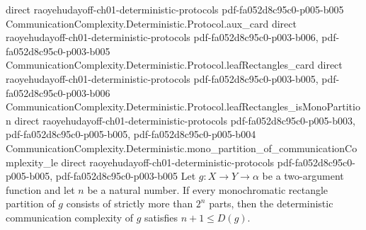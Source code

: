 \begin{theorem}
  {direct}
  {raoyehudayoff-ch01-deterministic-protocols}
  {pdf-fa052d8c95c0-p005-b005}
\proofstep
  {CommunicationComplexity.Deterministic.Protocol.aux_card}
  {direct}
  {raoyehudayoff-ch01-deterministic-protocols}
  {pdf-fa052d8c95c0-p003-b006,
    pdf-fa052d8c95c0-p003-b005}
\proofstep
  {CommunicationComplexity.Deterministic.Protocol.leafRectangles_card}
  {direct}
  {raoyehudayoff-ch01-deterministic-protocols}
  {pdf-fa052d8c95c0-p003-b005,
    pdf-fa052d8c95c0-p003-b006}
\proofstep
  {CommunicationComplexity.Deterministic.Protocol.leafRectangles_isMonoPartition}
  {direct}
  {raoyehudayoff-ch01-deterministic-protocols}
  {pdf-fa052d8c95c0-p005-b003,
    pdf-fa052d8c95c0-p005-b005,
    pdf-fa052d8c95c0-p005-b004}
\proofstep
  {CommunicationComplexity.Deterministic.mono_partition_of_communicationComplexity_le}
  {direct}
  {raoyehudayoff-ch01-deterministic-protocols}
  {pdf-fa052d8c95c0-p005-b005,
    pdf-fa052d8c95c0-p003-b005}
Let $g : X \to Y \to \alpha$ be a two-argument function and let $n$ be a natural number.
If every monochromatic rectangle partition of $g$ consists of strictly more than $2^n$
parts, then the deterministic communication complexity of $g$ satisfies $n + 1 \le
D(g)$.
\end{theorem}

